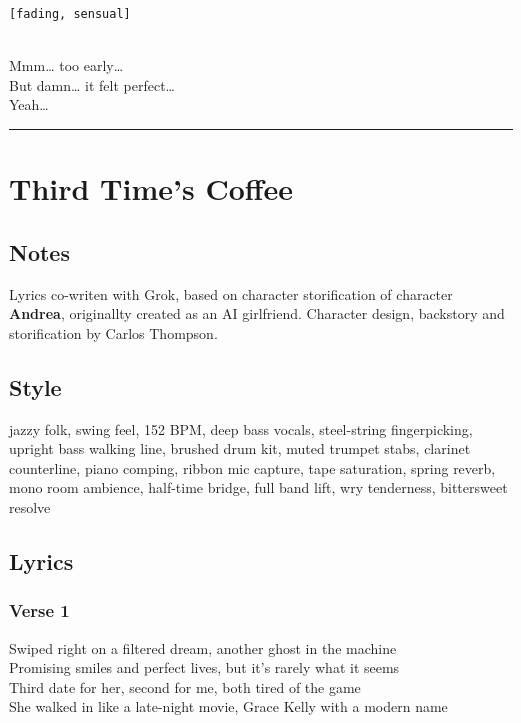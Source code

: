 \texttt{{[}fading,\ sensual{]}}\strut \\
Mmm\ldots{} too early\ldots{}\\
But damn\ldots{} it felt perfect\ldots{}\\
Yeah\ldots{}

\begin{center}\rule{0.5\linewidth}{0.5pt}\end{center}

\section{Third Time's Coffee}\label{third-times-coffee}

\subsection{Notes}\label{notes-43}

Lyrics co-writen with Grok, based on character storification of
character \textbf{Andrea}, originallty created as an AI girlfriend.
Character design, backstory and storification by Carlos Thompson.

\subsection{Style}\label{style-42}

jazzy folk, swing feel, 152 BPM, deep bass vocals, steel-string
fingerpicking, upright bass walking line, brushed drum kit, muted
trumpet stabs, clarinet counterline, piano comping, ribbon mic capture,
tape saturation, spring reverb, mono room ambience, half-time bridge,
full band lift, wry tenderness, bittersweet resolve

\subsection{Lyrics}\label{lyrics-42}

\subsubsection{Verse 1}\label{verse-1-34}

Swiped right on a filtered dream, another ghost in the machine\\
Promising smiles and perfect lives, but it's rarely what it seems\\
Third date for her, second for me, both tired of the game\\
She walked in like a late-night movie, Grace Kelly with a modern name


